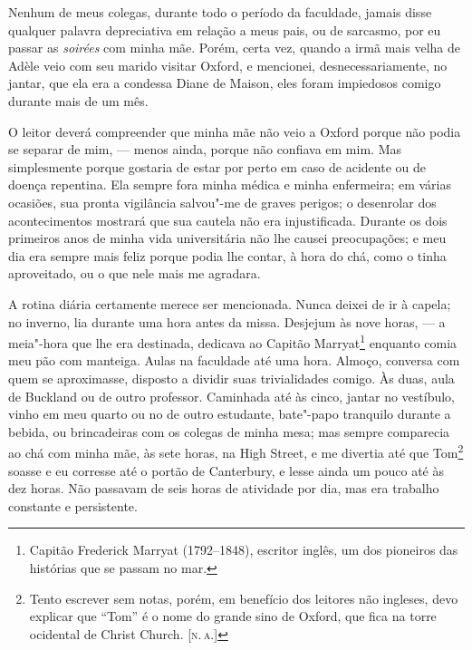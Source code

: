 Nenhum de meus colegas, durante todo o período da faculdade, jamais
disse qualquer palavra depreciativa em relação a meus pais, ou de
sarcasmo, por eu passar as \textit{soirées} com minha mãe. Porém, certa
vez, quando a irmã mais velha de Adèle veio com seu marido visitar
Oxford, e mencionei, desnecessariamente, no jantar, que ela era a
condessa Diane de Maison, eles foram impiedosos comigo durante mais de
um mês.

O leitor deverá compreender que minha mãe não veio a Oxford porque não
podia se separar de mim, --- menos ainda, porque não confiava em mim. Mas
simplesmente porque gostaria de estar por perto em caso de acidente ou
de doença repentina. Ela sempre fora minha médica e minha enfermeira; em
várias ocasiões, sua pronta vigilância salvou"-me de graves perigos; o
desenrolar dos acontecimentos mostrará que sua cautela não era
injustificada. Durante os dois primeiros anos de minha vida
universitária não lhe causei preocupações; e meu dia era sempre mais
feliz porque podia lhe contar, à hora do chá, como o tinha aproveitado,
ou o que nele mais me agradara.

A rotina diária certamente merece ser mencionada. Nunca deixei de
ir à capela; no inverno, lia durante uma hora antes da missa. Desjejum
às nove horas, --- a meia"-hora que lhe era destinada, dedicava ao Capitão
Marryat\footnote{Capitão Frederick Marryat (1792--1848), escritor inglês,
  um dos pioneiros das histórias que se passam no mar.}
enquanto comia meu pão com manteiga. Aulas na faculdade até uma hora.
Almoço, conversa com quem se aproximasse, disposto a dividir suas
trivialidades comigo. Às duas, aula de Buckland ou de outro professor.
Caminhada até às cinco, jantar no vestíbulo, vinho em meu quarto ou no
de outro estudante, bate"-papo tranquilo durante a bebida, ou
brincadeiras com os colegas de minha mesa; mas sempre comparecia ao chá
com minha mãe, às sete horas, na High Street, e me divertia até que
Tom\footnote{Tento escrever sem notas, porém, em benefício dos leitores
  não ingleses, devo explicar que ``Tom'' é o nome do grande sino de
  Oxford, que fica na torre ocidental de Christ Church. {[}\textsc{n.\,a.}{]}}
soasse e eu corresse até o portão de Canterbury, e lesse ainda um pouco
até às dez horas. Não passavam de seis horas de atividade por dia, mas
era trabalho constante e persistente.

